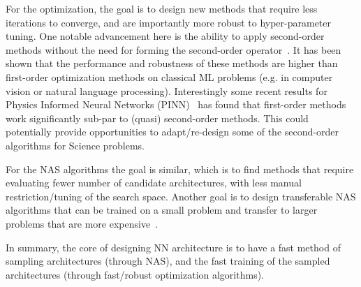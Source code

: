 For the optimization, the goal is to design new methods that require less iterations to converge, and are importantly
more robust to hyper-parameter tuning.
One notable advancement here is the ability to apply second-order methods
without the need for forming the second-order operator~\cite{yao2020adahessian,yao2019pyhessian,gupta2018shampoo,reddi2018adaptive}.
It has been shown that the performance and robustness of these methods are higher than
first-order optimization methods on classical ML problems (e.g. in computer vision or natural language processing).
Interestingly some recent results for Physics Informed Neural Networks (PINN)~\cite{raissi2019physics} has
found that first-order methods work significantly sub-par to (quasi) second-order methods.
This could potentially provide opportunities to adapt/re-design some of the second-order algorithms for Science problems.

For the NAS algorithms the goal is similar, which is to find methods
that require evaluating fewer number of candidate architectures, with less manual restriction/tuning
of the search space.
Another goal is to design transferable NAS algorithms that can be trained on a small problem
and transfer to larger problems that are more expensive~\cite{cai2018proxylessnas,cai2019once}.

In summary, the core of designing NN architecture is to have a fast method of sampling architectures (through NAS),
and the fast training of the sampled architectures (through fast/robust optimization algorithms).



